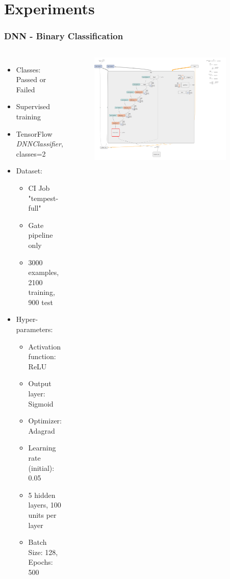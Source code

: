 \documentclass[aspectratio=169,11pt,hyperref={colorlinks=true}]{beamer}
\begin{document}
\section{Experiments}
\begin{frame}
    \frametitle{DNN - Binary Classification}
    \begin{columns}
        \begin{itemize}
            \item{Classes: Passed or Failed}
            \item{Supervised training}
            \item{TensorFlow \emph{DNNClassifier}, classes=2}
            \item{Dataset:}
            \begin{itemize}
              \item{CI Job "tempest-full"}
              \item{Gate pipeline only}
              \item{3000 examples, 2100 training, 900 test}
            \end{itemize}
            \item{Hyper-parameters:}
            \begin{itemize}
              \item{Activation function: ReLU}
              \item{Output layer: Sigmoid}
              \item{Optimizer: Adagrad}
              \item{Learning rate (initial): 0.05}
              \item{5 hidden layers, 100 units per layer}
              \item{Batch Size: 128, Epochs: 500}
            \end{itemize}
        \end{itemize}
        \begin{figure}
        \begin{center}
          \includegraphics[width=0.9\textwidth]{diagrams/binary_class_network_diagram.png}

\end{center}
\end{figure}
\end{columns}
\end{frame}
\end{document}
